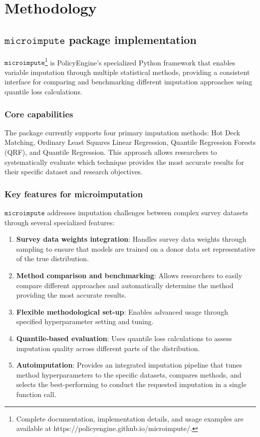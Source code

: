 \section{Methodology}\label{sec:methodology}

\subsection{$\texttt{microimpute}$ package implementation}

$\texttt{microimpute}$\footnote{Complete documentation, implementation details, and usage examples are available at https://policyengine.github.io/microimpute/.} is PolicyEngine's specialized Python framework that enables variable imputation through multiple statistical methods, providing a consistent interface for comparing and benchmarking different imputation approaches using quantile loss calculations.

\subsubsection{Core capabilities}

The package currently supports four primary imputation methods: Hot Deck Matching, Ordinary Least Squares Linear Regression, Quantile Regression Forests (QRF), and Quantile Regression. This approach allows researchers to systematically evaluate which technique provides the most accurate results for their specific dataset and research objectives.

\subsubsection{Key features for microimputation}

$\texttt{microimpute}$ addresses imputation challenges between complex survey datasets through several specialized features:

\begin{enumerate}
    \item \textbf{Survey data weights integration}: Handles survey data weights through sampling to ensure that models are trained on a donor data set representative of the true distribution.
    \item \textbf{Method comparison and benchmarking}: Allows researchers to easily compare different approaches and automatically determine the method providing the most accurate results.
    \item \textbf{Flexible methodological set-up}: Enables advanced usage through specified hyperparameter setting and tuning.
    \item \textbf{Quantile-based evaluation}: Uses quantile loss calculations to assess imputation quality across different parts of the distribution.
    \item \textbf{Autoimputation}: Provides an integrated imputation pipeline that tunes method hyperparameters to the specific datasets, compares methods, and selects the best-performing to conduct the requested imputation in a single function call.
\end{enumerate}


